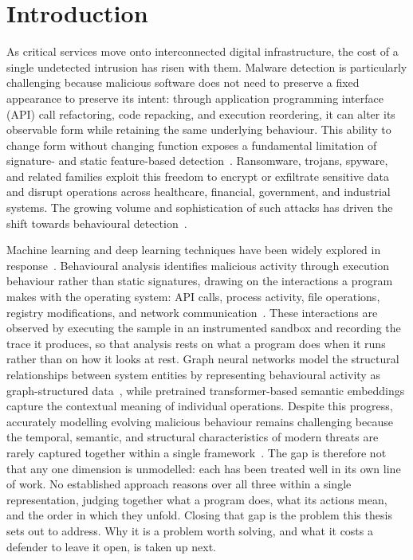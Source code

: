 \documentclass[%
    BCOR=10mm,
    DIV=13,
    toc=bibliography,
    toc=listof,
    oneside,
    12pt,
]{scrbook}
\begin{document}
\setcapindent{0pt}

\chapter{Introduction}
\label{chap:introduction}

As critical services move onto interconnected digital infrastructure, the cost
of a single undetected intrusion has risen with them. Malware detection is
particularly challenging because malicious software does not need to preserve a
fixed appearance to preserve its intent: through application programming
interface (API) call refactoring, code repacking, and execution reordering, it
can alter its observable form while retaining the same underlying behaviour.
This ability to change form without changing function exposes a fundamental
limitation of signature- and static feature-based
detection~\cite{amer2025graphshield}. Ransomware, trojans, spyware, and related
families exploit this freedom to encrypt or exfiltrate sensitive data and
disrupt operations across healthcare, financial, government, and industrial
systems. The growing volume and sophistication of such attacks has driven
the shift towards behavioural detection~\cite{bilot2023intrusion}.

Machine learning and deep learning techniques have been widely explored in
response~\cite{bilot2024survey}. Behavioural analysis identifies malicious
activity through execution behaviour rather than static signatures, drawing on
the interactions a program makes with the operating system: API calls, process
activity, file operations, registry modifications, and network
communication~\cite{mimura2022nlp}. These interactions are observed by
executing the sample in an instrumented sandbox and recording the trace it
produces, so that analysis rests on what a program does when it runs rather
than on how it looks at rest. Graph neural networks model the structural
relationships between system entities by representing behavioural activity as
graph-structured data~\cite{hamilton2017graphsage, wang2019matchgnet}, while
pretrained transformer-based semantic embeddings capture the contextual meaning
of individual operations. Despite this progress, accurately modelling evolving
malicious behaviour remains challenging because the temporal, semantic, and
structural characteristics of modern threats are rarely captured together
within a single framework~\cite{bilot2024survey}. The gap is therefore not that
any one dimension is unmodelled: each has been treated well in its own line of
work. No established approach reasons over all three within a single
representation, judging together what a program does, what its actions mean,
and the order in which they unfold.
Closing that gap is the problem this thesis sets out to address. Why it is a
problem worth solving, and what it costs a defender to leave it open, is taken
up next.
\end{document}
